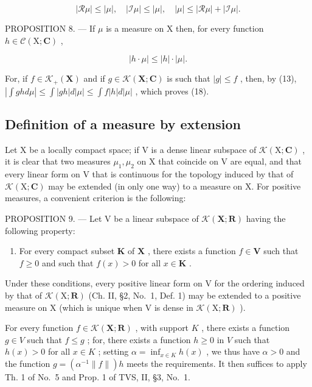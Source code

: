 \[
| \mathcal {R} \mu | \leqslant | \mu |, \quad | \mathcal {I} \mu | \leqslant | \mu |, \quad | \mu | \leqslant | \mathcal {R} \mu | + | \mathcal {I} \mu |.\tag{17}
\]

PROPOSITION 8. --- If \(\mu\) is a measure on X then, for every function \(h \in \mathcal{C}(\mathrm{X};\mathbf{C})\) ,

\[
\left| h \cdot \mu \right| \leqslant \left| h \right| \cdot \left| \mu \right|.\tag{18}
\]

For, if \(f \in \mathcal{K}_+(\mathbf{X})\) and if \(g \in \mathcal{K}(\mathbf{X};\mathbf{C})\) is such that \(|g| \leqslant f\) , then, by (13), \(|\int gh d\mu| \leqslant \int |gh| d|\mu| \leqslant \int f|h| d|\mu|\) , which proves (18).

\subsection{Definition of a measure by extension}

Let X be a locally compact space; if V is a dense linear subspace of \(\mathcal{K}(\mathrm{X};\mathbf{C})\) , it is clear that two measures \(\mu_{1}, \mu_{2}\) on X that coincide on V are equal, and that every linear form on V that is continuous for the topology induced by that of \(\mathcal{K}(\mathrm{X};\mathbf{C})\) may be extended (in only one way) to a measure on X. For positive measures, a convenient criterion is the following:

PROPOSITION 9. --- Let V be a linear subspace of \(\mathcal{K}(\mathbf{X};\mathbf{R})\) having the following property:

\begin{enumerate}
\def\labelenumi{(\Alph{enumi})}
\setcounter{enumi}{15}
\tightlist
\item
  For every compact subset \(\mathbf{K}\) of \(\mathbf{X}\) , there exists a function \(f \in \mathbf{V}\) such that \(f \geqslant 0\) and such that \(f(x) > 0\) for all \(x \in \mathbf{K}\) .
\end{enumerate}

Under these conditions, every positive linear form on V for the ordering induced by that of \(\mathcal{K}(\mathrm{X};\mathbf{R})\) (Ch. II, §2, No.~1, Def. 1) may be extended to a positive measure on X (which is unique when V is dense in \(\mathcal{K}(\mathrm{X};\mathbf{R})\) ).

For every function \(f \in \mathcal{K}(\mathbf{X};\mathbf{R})\) , with support \(K\) , there exists a function \(g \in V\) such that \(f \leqslant g\) ; for, there exists a function \(h \geqslant 0\) in \(V\) such that \(h(x) > 0\) for all \(x \in K\) ; setting \(\alpha = \inf_{x \in K} h(x)\) , we thus have \(\alpha > 0\) and the function \(g = (\alpha^{-1} \|f\|)h\) meets the requirements. It then suffices to apply Th. 1 of No.~5 and Prop. 1 of TVS, II, §3, No.~1.

